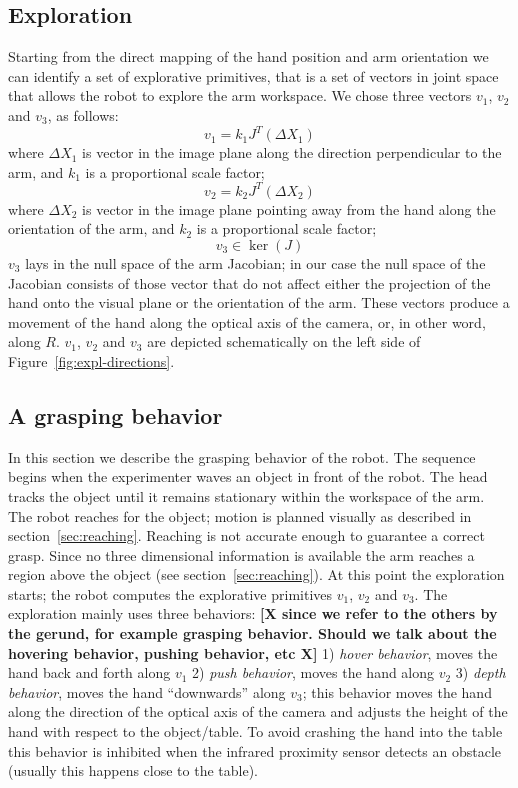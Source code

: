 \subsection{Exploration}
Starting from the direct mapping of the hand position and arm orientation we
can identify a set of explorative primitives, that is a set of vectors in
joint space that allows the robot to explore the arm workspace. We chose three
vectors $v_1$, $v_2$ and $v_3$, as follows:
\begin{equation}
  v_1=k_1J^T\left(\Delta X_1\right)
\end{equation}
where $\Delta X_1$ is vector in the image plane along the direction
perpendicular to the arm, and $k_1$ is a proportional scale factor;
\begin{equation}
  v_2=k_2J^T\left(\Delta X_2\right)
\end{equation}
where $\Delta X_2$ is vector in the image plane pointing away from
the hand along the orientation of the arm, and $k_2$ is a
proportional scale factor;
\begin{equation}
 v_3\in \ker \left(J\right)
\end{equation}
$v_3$ lays in the null space of the arm Jacobian; in our case the
null space of the Jacobian consists of those vector that do not affect
either the projection of the hand onto the visual plane or the orientation
of the arm. These vectors produce a movement of the hand along the optical
axis of the camera, or, in other word, along $R$.
$v_1$, $v_2$ and $v_3$ are depicted schematically on the left side of
Figure~\ref{fig:expl-directions}.

\subsection{A grasping behavior}
In this section we describe the grasping behavior of the robot.
The sequence begins when the experimenter waves an object in front
of the robot. The head tracks the object until it remains
stationary within the workspace of the arm. The robot reaches for
the object; motion is planned visually as described in
section~\ref{sec:reaching}. Reaching is not accurate enough to
guarantee a correct grasp. Since no three dimensional information
is available the arm reaches a region above the object (see
section~\ref{sec:reaching}). At this point the exploration starts;
the robot computes the explorative primitives $v_1$, $v_2$ and
$v_3$. The exploration mainly uses three behaviors: \textbf{[X
since we refer to the others by the gerund, for example grasping
behavior. Should we talk about the hovering behavior, pushing
behavior, etc X]} 1) \emph{hover behavior}, moves the hand back
and forth along $v_1$ 2) \emph{push behavior}, moves the hand
along $v_2$ 3) \emph{depth behavior}, moves the hand ``downwards''
along $v_3$; this behavior moves the hand along the direction of
the optical axis of the camera and adjusts the height of the hand
with respect to the object/table. To avoid crashing the hand into
the table this behavior is inhibited when the infrared proximity
sensor detects an obstacle (usually this happens close to the
table).

